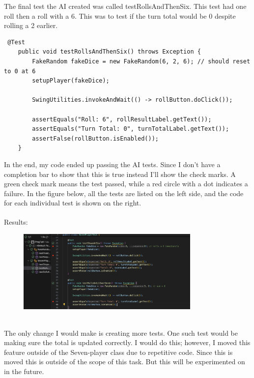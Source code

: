 \documentclass[a4paper,11pt]{article}
\begin{document}
The final test the AI created was called testRollsAndThenSix. This test had one roll then a roll with a 6. This was to test if the turn total would be 0 despite rolling a 2 earlier. 
\begin{lstlisting}
 @Test
    public void testRollsAndThenSix() throws Exception {
        FakeRandom fakeDice = new FakeRandom(6, 2, 6); // should reset to 0 at 6
        setupPlayer(fakeDice);

        SwingUtilities.invokeAndWait(() -> rollButton.doClick());

        assertEquals("Roll: 6", rollResultLabel.getText());
        assertEquals("Turn Total: 0", turnTotalLabel.getText());
        assertFalse(rollButton.isEnabled());
    }
\end{lstlisting}
In the end, my code ended up passing the AI tests. Since I don't have a completion bar to show that this is true instead I'll show the check marks. A green check mark means the test passed, while a red circle with a dot indicates a failure. In the figure below, all the tests are listed on the left side, and the code for each individual test is shown on the right.\\\\  
Results:
\begin{figure}[h] 
    \centering
    \includegraphics[width=0.80\textwidth]{JunitTest.png}
    \label{fig:first}
\end{figure}\\
The only change I would make is creating more tests. One such test would be making sure the total is updated correctly. I would do this; however, I moved this feature outside of the Seven-player class due to repetitive code. Since this is moved this is outside of the scope of this task. But this will be experimented on in the future.
\end{document}
